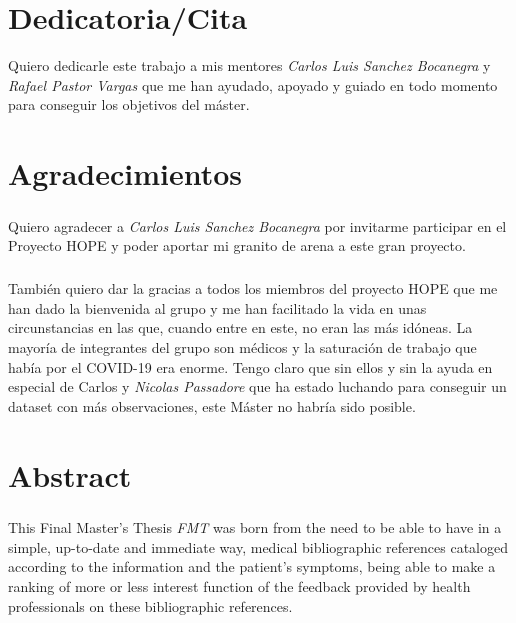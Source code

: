 \chapter*{Dedicatoria/Cita}

Quiero dedicarle este trabajo a mis mentores \textit{Carlos Luis Sanchez Bocanegra} y \textit{Rafael Pastor Vargas} que me han ayudado, apoyado y guiado en todo momento para conseguir los objetivos del máster.

\chapter*{Agradecimientos}

\paragraph{}
Quiero agradecer a \textit{Carlos Luis Sanchez Bocanegra} por invitarme participar en el Proyecto HOPE y poder aportar mi granito de arena a este gran proyecto.

\paragraph{}
También quiero dar la gracias a todos los miembros del proyecto HOPE que me han dado la bienvenida al grupo y me han facilitado la vida en unas circunstancias en las que, cuando entre en este, no eran las más idóneas. La mayoría de integrantes del grupo son médicos y la saturación de trabajo que había por el COVID-19 era enorme. Tengo claro que sin ellos y sin la ayuda en especial de Carlos y \textit{Nicolas Passadore} que ha estado luchando para conseguir un dataset con más observaciones, este Máster no habría sido posible.

\chapter*{Abstract}

\onehalfspacing
\paragraph{}
This Final Master's Thesis {\textit{FMT}} was born from the need to be able to have in a simple, up-to-date and immediate way, medical bibliographic references cataloged according to the information and the patient's symptoms, being able to make a ranking of more or less interest function of the feedback provided by health professionals on these bibliographic references.

